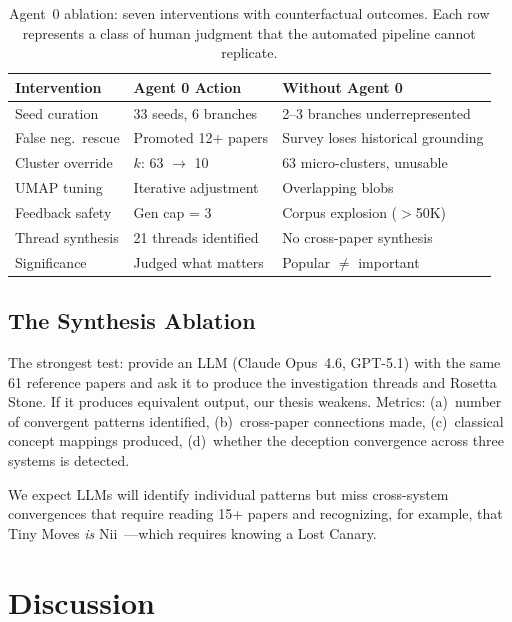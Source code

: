 \documentclass{article}
\begin{document}
\begin{table}[t]
\centering
\small
\begin{tabular}{p{1.7cm}p{1.6cm}p{2.1cm}}
\toprule
\textbf{Intervention} & \textbf{Agent 0 Action} & \textbf{Without Agent 0} \\
\midrule
Seed curation & 33 seeds, 6 branches & 2--3 branches under\-represented \\
False neg.\ rescue & Promoted 12+ papers & Survey loses historical grounding \\
Cluster override & $k$: 63 $\to$ 10 & 63 micro-clusters, unusable \\
UMAP tuning & Iterative adjustment & Overlapping blobs \\
Feedback safety & Gen cap = 3 & Corpus explosion ($>$50K) \\
Thread synthesis & 21 threads identified & No cross-paper synthesis \\
Significance & Judged what matters & Popular $\neq$ important \\
\bottomrule
\end{tabular}
\caption{Agent~0 ablation: seven interventions with counterfactual
outcomes. Each row represents a class of human judgment that the
automated pipeline cannot replicate.}
\label{tab:ablation}
\end{table}


\subsection{The Synthesis Ablation}
\label{sec:synthesis-ablation}

The strongest test: provide an LLM (Claude Opus~4.6, GPT-5.1) with the
same 61 reference papers and ask it to produce the investigation threads
and Rosetta Stone. If it produces equivalent output, our thesis weakens.
Metrics: (a)~number of convergent patterns identified, (b)~cross-paper
connections made, (c)~classical concept mappings produced, (d)~whether
the deception convergence across three systems is detected.

We expect LLMs will identify individual patterns but miss cross-system
convergences that require reading 15+ papers and recognizing, for
example, that Tiny Moves \emph{is} Nii~---which
requires knowing a Lost Canary.


\section{Discussion}
\label{sec:discussion}
\end{document}
